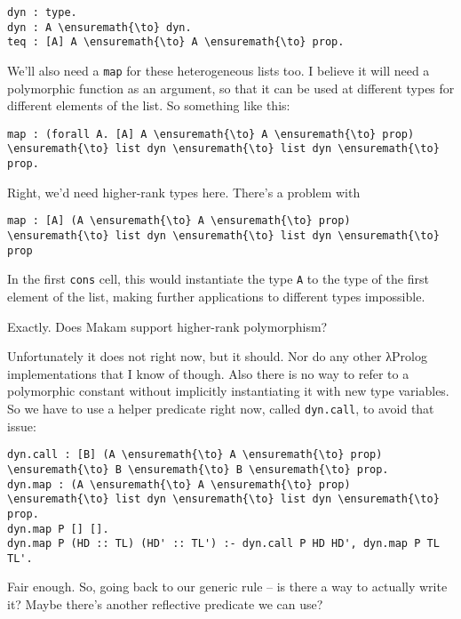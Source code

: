 \begin{verbatim}
dyn : type.
dyn : A \ensuremath{\to} dyn.
teq : [A] A \ensuremath{\to} A \ensuremath{\to} prop.
\end{verbatim}

\heroSTUDENT{} We'll also need a \texttt{map} for these heterogeneous lists
too. I believe it will need a polymorphic function as an argument, so
that it can be used at different types for different elements of the
list. So something like this:

\begin{verbatim}
map : (forall A. [A] A \ensuremath{\to} A \ensuremath{\to} prop) \ensuremath{\to} list dyn \ensuremath{\to} list dyn \ensuremath{\to} prop.
\end{verbatim}

\heroADVISOR{} Right, we'd need higher-rank types here. There's a problem with

\begin{verbatim}
map : [A] (A \ensuremath{\to} A \ensuremath{\to} prop) \ensuremath{\to} list dyn \ensuremath{\to} list dyn \ensuremath{\to} prop
\end{verbatim}

In the first \texttt{cons} cell, this would instantiate the type
\texttt{A} to the type of the first element of the list, making further
applications to different types impossible.

\heroSTUDENT{} Exactly. Does Makam support higher-rank polymorphism?

\heroADVISOR{} Unfortunately it does not right now, but it should. Nor do any
other \foreignlanguage{greek}{λ}Prolog implementations that I know of though. Also there is no
way to refer to a polymorphic constant without implicitly instantiating
it with new type variables. So we have to use a helper predicate right
now, called \texttt{dyn.call}, to avoid that issue:

\begin{verbatim}
dyn.call : [B] (A \ensuremath{\to} A \ensuremath{\to} prop) \ensuremath{\to} B \ensuremath{\to} B \ensuremath{\to} prop.
dyn.map : (A \ensuremath{\to} A \ensuremath{\to} prop) \ensuremath{\to} list dyn \ensuremath{\to} list dyn \ensuremath{\to} prop.
dyn.map P [] [].
dyn.map P (HD :: TL) (HD' :: TL') :- dyn.call P HD HD', dyn.map P TL TL'.
\end{verbatim}

\heroSTUDENT{} Fair enough. So, going back to our generic rule -- is there a
way to actually write it? Maybe there's another reflective predicate we
can use?

